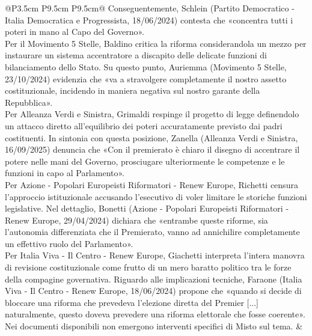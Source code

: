 \documentclass[a4paper,11pt]{article}
\begin{document}
\begin{landscape}
\begin{longtable}{@{}P{3.5cm} P{9.5cm} P{9.5cm}@{}}
Conseguentemente, Schlein (Partito Democratico - Italia Democratica e Progressista, 18/06/2024) contesta che «concentra tutti i poteri in mano al Capo del Governo».\\[6pt] Per il Movimento 5 Stelle, Baldino critica la riforma considerandola un mezzo per instaurare un sistema accentratore a discapito delle delicate funzioni di bilanciamento dello Stato. Su questo punto, Auriemma (Movimento 5 Stelle, 23/10/2024) evidenzia che «va a stravolgere completamente il nostro assetto costituzionale, incidendo in maniera negativa sul nostro garante della Repubblica».\\[6pt] Per Alleanza Verdi e Sinistra, Grimaldi respinge il progetto di legge definendolo un attacco diretto all'equilibrio dei poteri accuratamente previsto dai padri costituenti. In sintonia con questa posizione, Zanella (Alleanza Verdi e Sinistra, 16/09/2025) denuncia che «Con il premierato è chiaro il disegno di accentrare il potere nelle mani del Governo, prosciugare ulteriormente le competenze e le funzioni in capo al Parlamento».\\[6pt] Per Azione - Popolari Europeisti Riformatori - Renew Europe, Richetti censura l'approccio istituzionale accusando l'esecutivo di voler limitare le storiche funzioni legislative. Nel dettaglio, Bonetti (Azione - Popolari Europeisti Riformatori - Renew Europe, 29/04/2024) dichiara che «entrambe queste riforme, sia l'autonomia differenziata che il Premierato, vanno ad annichilire completamente un effettivo ruolo del Parlamento».\\[6pt] Per Italia Viva - Il Centro - Renew Europe, Giachetti interpreta l'intera manovra di revisione costituzionale come frutto di un mero baratto politico tra le forze della compagine governativa. Riguardo alle implicazioni tecniche, Faraone (Italia Viva - Il Centro - Renew Europe, 18/06/2024) propone che «quando si decide di bloccare una riforma che prevedeva l'elezione diretta del Premier [...] naturalmente, questo doveva prevedere una riforma elettorale che fosse coerente».\\[6pt] Nei documenti disponibili non emergono interventi specifici di Misto sul tema. & \\
\midrule

\end{longtable}
\end{landscape}
\end{document}
